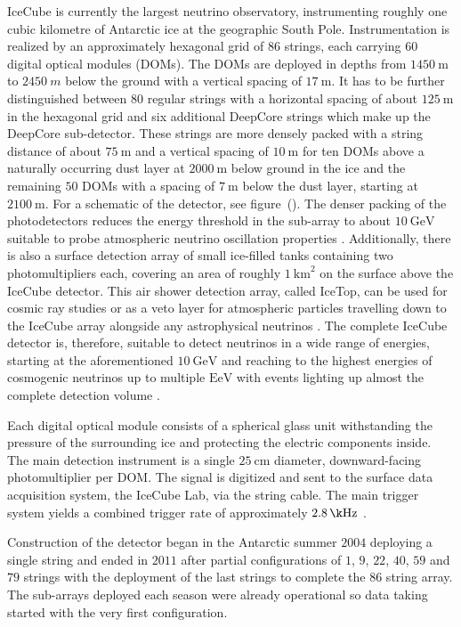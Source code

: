 IceCube is currently the largest neutrino observatory, instrumenting roughly one cubic kilometre of Antarctic ice at the geographic South Pole.
Instrumentation is realized by an approximately hexagonal grid of $\num{86}$ strings, each carrying 60 digital optical modules (DOMs).
The DOMs are deployed in depths from $\SI{1450}{\m}$ to $\SI{2450}{m}$ below the ground with a vertical spacing of $\SI{17}{\m}$.
It has to be further distinguished between $\num{80}$ regular strings with a horizontal spacing of about $\SI{125}{\m}$ in the hexagonal grid and six additional DeepCore strings which make up the DeepCore sub-detector.
These strings are more densely packed with a string distance of about $\SI{75}{\m}$ and a vertical spacing of $\SI{10}{\m}$ for ten DOMs above a naturally occurring dust layer at $\SI{2000}{\m}$ below ground in the ice and the remaining $\num{50}$ DOMs with a spacing of $\SI{7}{\m}$ below the dust layer, starting at $\SI{2100}{\m}$.
For a schematic of the detector, see figure~().
The denser packing of the photodetectors reduces the energy threshold in the sub-array to about $\SI{10}{\GeV}$ suitable to probe atmospheric neutrino oscillation properties .
Additionally, there is also a surface detection array of small ice-filled tanks containing two photomultipliers each, covering an area of roughly $\SI{1}{\km\squared}$ on the surface above the IceCube detector.
This air shower detection array, called IceTop, can be used for cosmic ray studies or as a veto layer for atmospheric particles travelling down to the IceCube array alongside any astrophysical neutrinos .
The complete IceCube detector is, therefore, suitable to detect neutrinos in a wide range of energies, starting at the aforementioned $\SI{10}{\GeV}$ and reaching to the highest energies of cosmogenic neutrinos up to multiple $\si{\exa\eV}$ with events lighting up almost the complete detection volume .

Each digital optical module consists of a spherical glass unit withstanding the pressure of the surrounding ice and protecting the electric components inside.
The main detection instrument is a single $\SI{25}{\cm}$ diameter, downward-facing photomultiplier per DOM.
The signal is digitized and sent to the surface data acquisition system, the IceCube Lab, via the string cable.
The main trigger system yields a combined trigger rate of approximately $\SI{2.8}{\k\Hz}$ .

Construction of the detector began in the Antarctic summer $\num{2004}$ deploying a single string and ended in $\num{2011}$ after partial configurations of $\num{1}$, $\num{9}$, $\num{22}$, $\num{40}$, $\num{59}$ and $\num{79}$ strings with the deployment of the last strings to complete the $\num{86}$ string array.
The sub-arrays deployed each season were already operational so data taking started with the very first configuration.


